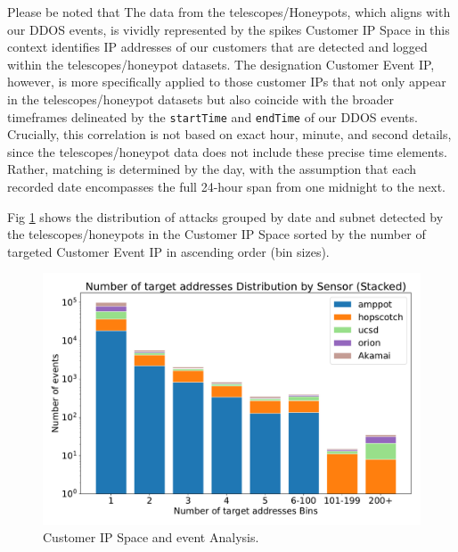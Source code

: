 Please be noted that The data from the telescopes/Honeypots, which aligns with our DDOS events, is vividly represented by the spikes Customer IP Space in this context identifies IP addresses of our customers that are detected and logged within the telescopes/honeypot datasets. 
The designation Customer Event IP, however, is more specifically applied to those customer IPs that not only appear in the telescopes/honeypot datasets but also coincide with the broader timeframes delineated by the \texttt{startTime} and \texttt{endTime} of our DDOS events. Crucially, this correlation is not based on exact hour, minute, and second details, since the telescopes/honeypot data does not include these precise time elements. Rather, matching is determined by the day, with the assumption that each recorded date encompasses the full 24-hour span from one midnight to the next.

Fig \ref{fig:akamai_spikes} shows the distribution of attacks grouped by date and subnet detected by the telescopes/honeypots in the Customer IP Space sorted by the number of targeted Customer Event IP in ascending order (bin sizes).
\begin{figure}[htbp]
    \centering
    \includegraphics[scale=0.48]{graphs/bins.pdf}
    \caption{Customer IP Space and event Analysis.}
    \label{fig:akamai_spikes}
\end{figure}




